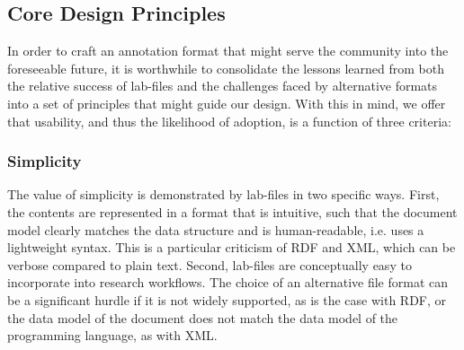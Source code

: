 \subsection{Core Design Principles}
\label{subsec:design}


In order to craft an annotation format that might serve the community into the foreseeable future, it is worthwhile to consolidate the lessons learned from both the relative success of lab-files and the challenges faced by alternative formats into a set of principles that might guide our design.
With this in mind, we offer that usability, and thus the likelihood of adoption, is a function of three criteria:

\subsubsection{Simplicity}
\label{subsubsec:simplicity}
The value of simplicity is demonstrated by lab-files in two specific ways.
First, the contents are represented in a format that is intuitive, such that the document model clearly matches the data structure and is human-readable, i.e. uses a lightweight syntax.
This is a particular criticism of RDF and XML, which can be verbose compared to plain text.
Second, lab-files are conceptually easy to incorporate into research workflows.
The choice of an alternative file format can be a significant hurdle if it is not widely supported, as is the case with RDF, or the data model of the document does not match the data model of the programming language, as with XML.

